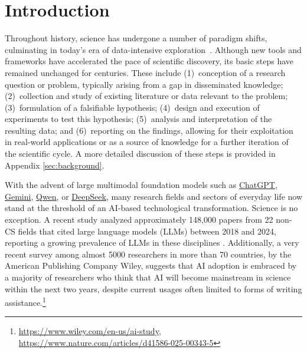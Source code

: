 \section{Introduction}\label{sec:introduction}

Throughout history, science has undergone a number of paradigm shifts, culminating in today's era of data-intensive exploration~\cite{hey2009jim}. Although new tools and frameworks have accelerated the pace of scientific discovery, its basic steps have remained unchanged for centuries. These include (1)~conception of a research question or problem, typically arising from a gap in disseminated knowledge; (2)~collection and study of existing literature or data relevant to the problem; (3)~formulation of a falsifiable hypothesis; (4)~design and execution of experiments to test this hypothesis; (5)~analysis and interpretation of the resulting data; and (6)~reporting on the findings, allowing for their exploitation in real-world applications or as a source of knowledge for a further iteration of the scientific cycle. A more detailed discussion of these steps is provided in Appendix \ref{sec:background}.

With the advent of large multimodal foundation models such as \href{https://chatgpt.com/}{ChatGPT}, \href{https://deepmind.google/technologies/gemini/}{Gemini}, \href{https://github.com/QwenLM/Qwen}{Qwen}, or \href{https://www.deepseek.com/}{DeepSeek}, many research fields and sectors of everyday life now stand at the threshold of an AI-based technological transformation. Science is no exception. A recent study analyzed approximately 148,000 papers from 22 non-CS fields that cited large language models (LLMs) between 2018 and 2024, reporting a growing prevalence of LLMs in these disciplines \cite{pramanick2024transformingscholarlylandscapesinfluence}. Additionally, a very recent survey among almost 5000 researchers in more than 70 countries, by the American Publishing Company Wiley, suggests that AI adoption is embraced by a majority of researchers who think that AI will become mainstream in science within the next two years, despite current usages often limited to forms of writing assistance.\footnote{\url{https://www.wiley.com/en-us/ai-study}, \url{https://www.nature.com/articles/d41586-025-00343-5}}

